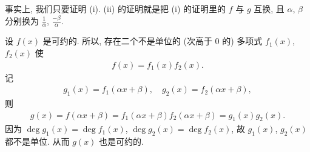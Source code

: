 \begin{pf}
    事实上, 我们只要证明 (i). (ii) 的证明就是把 (i) 的证明里的 $f$ 与 $g$ 互换, 且 $\alpha$, $\beta$ 分别换为 $\frac{1}{\alpha}$, $\frac{-\beta}{\alpha}$.

    设 $f(x)$ 是可约的. 所以, 存在二个不是单位的 (次高于 $0$ 的) 多项式 $f_1 (x)$, $f_2 (x)$ 使
    \begin{align*}
        f(x) = f_1 (x) f_2 (x).
    \end{align*}
    记
    \begin{align*}
        g_1 (x) = f_1 (\alpha x + \beta), \quad g_2 (x) = f_2 (\alpha x + \beta),
    \end{align*}
    则
    \begin{align*}
        g(x) = f(\alpha x + \beta) = f_1 (\alpha x + \beta) f_2 (\alpha x + \beta) = g_1 (x) g_2 (x).
    \end{align*}
    因为 $\deg g_1 (x) = \deg f_1 (x)$, $\deg g_2 (x) = \deg f_2 (x)$, 故 $g_1 (x)$, $g_2 (x)$ 都不是单位. 从而 $g(x)$ 也是可约的.
\end{pf}

